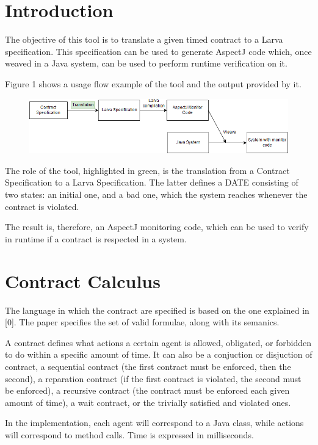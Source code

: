 \documentclass{article}
\begin{document}
\section{Introduction}

The objective of this tool is to translate a given timed contract to a Larva specification. This specification can be used to generate AspectJ code which, once weaved in a Java system, can be used to perform runtime verification on it.

Figure 1 shows a usage flow example of the tool and the output provided by it.

\begin{figure}[hp]
  \centering
  \includegraphics[scale=0.5]{Larva-rt-tutorial.png}
\end{figure}

The role of the tool, highlighted in green, is the translation from a Contract Specification to a Larva Specification. The latter defines a DATE consisting of two states: an initial one, and a bad one, which the system reaches whenever the contract is violated.

The result is, therefore, an AspectJ monitoring code, which can be used to verify in runtime if a contract is respected in a system.

\section{Contract Calculus}

The language in which the contract are specified is based on the one explained in [0]. The paper specifies the set of valid formulae, along with its semanics.

A contract defines what actions a certain agent is allowed, obligated, or forbidden to do within a specific amount of time. It can also be a conjuction or disjuction of contract, a sequential contract (the first contract must be enforced, then the second), a reparation contract (if the first contract is violated, the second must be enforced), a recursive contract (the contract must be enforced each given amount of time), a wait contract, or the trivially satisfied and violated ones.

In the implementation, each agent will correspond to a Java class, while actions will correspond to method calls. Time is expressed in milliseconds.
\end{document}

